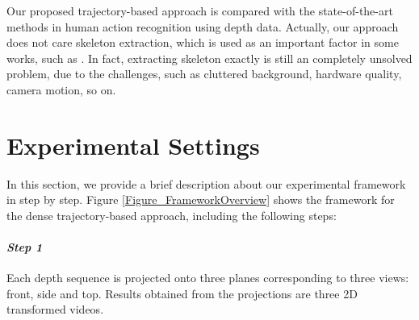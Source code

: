 \documentclass[final,3p,times,twocolumn]{elsarticle}
\begin{document}


Our proposed trajectory-based approach is compared with the state-of-the-art methods in human action recognition using depth data. Actually, our approach does not care skeleton extraction, which is used as an important factor in some works, such as \cite{wang2012mining, yang2012eigenjoints}. In fact, extracting skeleton exactly is still an completely unsolved problem, due to the challenges, such as cluttered background, hardware quality, camera motion, so on.

\section{Experimental Settings}
\label{Section_ExperimentalSettings}

In this section, we provide a brief description about our experimental framework in step by step.
Figure \ref{Figure_FrameworkOverview} shows the framework for the dense trajectory-based approach, including the following steps:

\paragraph{\bf \textit{Step 1}}
Each depth sequence is projected onto three planes corresponding to three views: front, side and top.
Results obtained from the projections are three 2D transformed videos.
\end{document}
